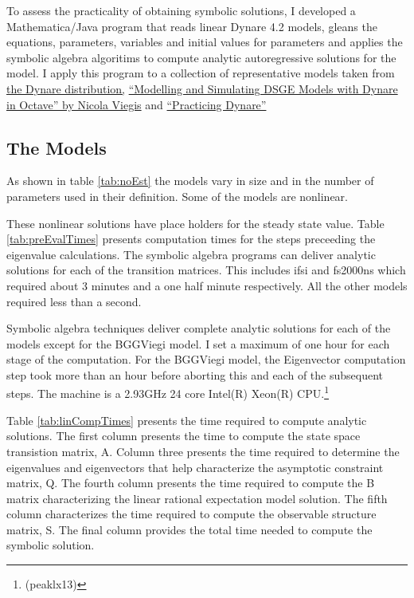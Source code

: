 \documentclass[12pt]{article}
\begin{document}
To assess the practicality of obtaining symbolic solutions, I developed
a Mathematica/Java program that
reads linear Dynare 4.2 models, gleans the equations,  parameters, 
variables and   initial values for parameters and 
applies the symbolic algebra algoritims to compute analytic 
autoregressive solutions for the model.
I apply this program to a collection of representative models taken from 
\href{http://www.dynare.org/documentation-and-support/faq/basics}{the Dynare distribution,}
\href{http://www.nviegi.net/research/dsge.htm}{``Modelling and Simulating DSGE Models with Dynare in Octave'' by Nicola Viegis} and 
\href{http://homepages.nyu.edu/~ts43/research/AP_tom16.pdf}{``Practicing Dynare''\cite{bhandari10}}


    \subsection{The Models }
As shown in table \ref{tab:noEst} the models vary in size and in the number of parameters used in their
definition. Some of the models are nonlinear.



  These nonlinear solutions have place holders for the steady state value.
Table \ref{tab:preEvalTimes} presents computation times for the steps
preceeding the eigenvalue calculations.
The symbolic algebra programs can deliver analytic solutions for
each of the transition matrices. This includes ifsi and fs2000ns which required
about 3 minutes and a one half minute respectively. All the other models required less than a second.







Symbolic algebra techniques deliver complete 
analytic solutions for each of the
models except for the BGGViegi model. 
I set a maximum of one hour for each stage of the computation.
For the BGGViegi model, the Eigenvector computation 
step took more than an hour before aborting this and each of the subsequent 
steps.  
The machine is a 2.93GHz  24 core
Intel(R) Xeon(R) CPU.\footnote{(peaklx13)}





Table \ref{tab:linCompTimes} presents the time required to compute analytic 
solutions. The first column presents the time to compute the state space 
transistion matrix, A. Column three presents the time required to determine
the eigenvalues and eigenvectors that help characterize the asymptotic
constraint matrix, Q. The fourth column presents the time required to
compute the B matrix characterizing the linear rational expectation  model
solution.  The fifth column characterizes the time required to compute
the observable structure matrix, S.  The final column provides the
total time needed to compute the symbolic solution. 
\end{document}
